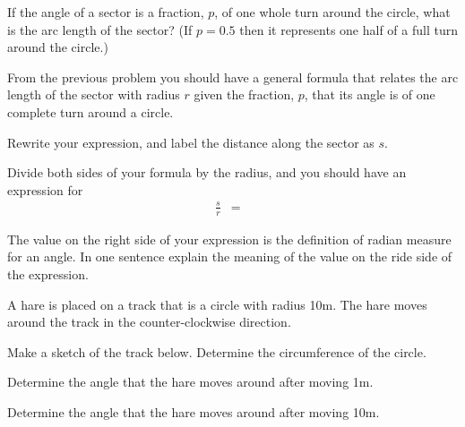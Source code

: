 \begin{problem}
\begin{subproblem}
    \vspace{4em}

  \item If the angle of a sector is a fraction, $p$, of one whole turn around
    the circle, what is the arc length of the sector? (If $p=0.5$ then it represents
    one half of a full turn around the circle.)
    \vspace{4em}

  \end{subproblem}

\clearpage

\item From the previous problem you should have a general formula that
  relates the arc length of the sector with radius $r$ given the
  fraction, $p$, that its angle is of one complete turn around a
  circle.

  \begin{subproblem}
  \item Rewrite your expression, and label the distance along the
    sector as $s$.
    \vfill
  \item Divide both sides of your formula by the radius, and you
    should have an expression for
    \begin{eqnarray*}
    \frac{s}{r} & = &
    \end{eqnarray*}

  \item The value on the right side of your expression is the
    definition of radian measure for an angle. In one sentence explain
    the meaning of the value on the ride side of the expression.

    \vfill

  \end{subproblem}

  \clearpage

\item A hare is placed on a track that is a circle with radius
  10m. The hare moves around the track in the counter-clockwise
  direction.
  \begin{subproblem}
  \item Make a sketch of the track below. Determine the circumference
    of the circle.
    \vfill

  \item Determine the angle that the hare moves around after moving
    1m.  
    \vfill

  \item Determine the angle that the hare moves around after moving 10m.
    \vfill


\end{subproblem}
\end{problem}
